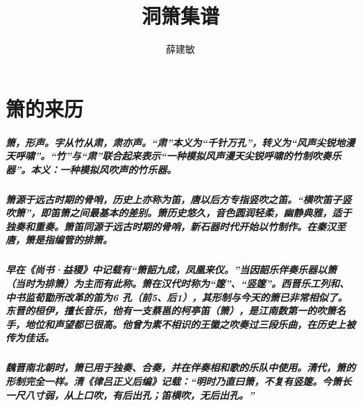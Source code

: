 \documentclass[cn,pad,chinesefont=nofont]{elegantbook}
\title{洞箫集谱}
\author{薛建敏}
\date{\zhtoday}
\begin{document}
\maketitle
\frontmatter
\tableofcontents
\mainmatter

\chapter{箫的来历}
\paragraph*{箫，形声。字从竹从肃，肃亦声。“肃”本义为“千针万孔”，转义为“风声尖锐地漫天呼啸”。“竹”与“肃”联合起来表示“一种模拟风声漫天尖锐呼啸的竹制吹奏乐器”。本义：一种模拟风吹声的竹乐器。}
\paragraph*{箫源于远古时期的骨哨，历史上亦称为笛，唐以后方专指竖吹之笛。“横吹笛子竖吹箫”，即笛箫之间最基本的差别。箫历史悠久，音色圆润轻柔，幽静典雅，适于独奏和重奏。箫笛同源于远古时期的骨哨，新石器时代开始以竹制作。在秦汉至唐，箫是指编管的排箫。} 
\paragraph*{早在《尚书·益稷》中记载有“箫韶九成，凤凰来仪。”当因韶乐伴奏乐器以箫（当时为排箫）为主而有此称。箫在汉代时称为“篴”、“竖篴”。西晋乐工列和、中书监荀勖所改革的笛为6 孔（前5、后1），其形制与今天的箫已非常相似了。东晋的桓伊，擅长音乐，他有一支蔡邕的柯亭笛（箫），是江南数第一的吹箫名手，地位和声望都已很高。他曾为素不相识的王徽之吹奏过三段乐曲，在历史上被传为佳话。}
\paragraph*{魏晋南北朝时，箫已用于独奏、合奏，并在伴奏相和歌的乐队中使用。清代，箫的形制完全一样。清《律吕正义后编》记载：“明时乃直曰箫，不复有竖篴。今箫长一尺八寸弱，从上口吹，有后出孔；笛横吹，无后出孔。”}
\end{document}
